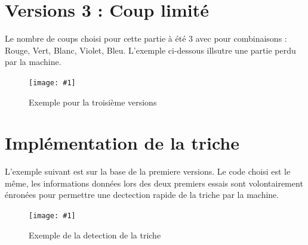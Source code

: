 \documentclass[a4paper,twoside,12pt]{report}
\newcommand{\monimage}[3]{
\par\noindent
\begin{figure}[H] %
\begin{center}
\texttt{[image: \#1]} %
\caption{#2} %
\label{#3} %
\end{center}
\end{figure} %
}
\begin{document}
\section*{Versions 3 : Coup limité}
Le nombre de coups choisi pour cette partie à été 3 avec pour combinaisons : Rouge, Vert, Blanc, Violet, Bleu. L'exemple ci-dessous illsutre
une partie perdu par la machine.
\monimage{mode3perdu.png}{Exemple pour la troisième versions}{M3P}
\section*{Implémentation de la triche}
L'exemple suivant est sur la base de la premiere versions. Le code choisi est le même, les informations données lors des deux premiers essais
sont volontairement énronées pour permettre une dectection rapide de la triche par la machine.
\monimage{mode1avectriche}{Exemple de la detection de la triche}{M2AT}
\end{document}
